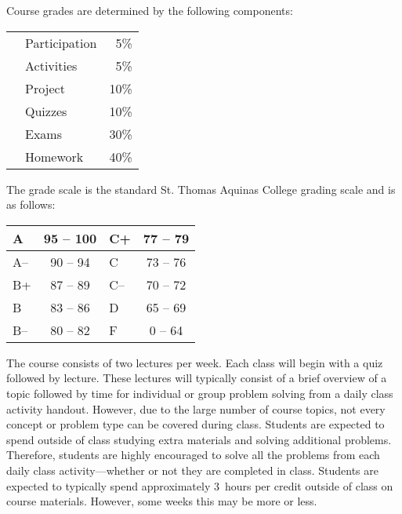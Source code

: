\documentclass[11pt,letterpaper]{article}
\begin{document}




Course grades are determined by the following components: \par
	\begin{table}[!ht]
        \begin{tabular}{clr}
	& Participation & 5\% \\
        & Activities & 5\% \\
	& Project & 10\% \\
	& Quizzes & 10\% \\
	& Exams & 30\% \\
	& Homework & 40\% 
        \end{tabular} 
        \end{table}
\sectionbreak



The grade scale is the standard St. Thomas Aquinas College grading scale and is as follows: \par
        \begin{table}[!ht]
        \centering
        \begin{tabular}{|l||c|l||c|} \hline
        A & 95 -- 100 & C+ & 77 -- 79 \\ \hline
        A-- & 90 -- 94 & C & 73 -- 76 \\ \hline
        B+ & 87 -- 89 & C-- & 70 -- 72 \\ \hline
        B & 83 -- 86 & D & 65 -- 69 \\ \hline
        B-- & 80 -- 82 & F & 0 -- 64 \\ \hline
        \end{tabular}
        \end{table}
\sectionbreak



The course consists of two lectures per week. Each class will begin with a quiz followed by lecture. These lectures will typically consist of a brief overview of a topic followed by time for individual or group problem solving from a daily class activity handout. However, due to the large number of course topics, not every concept or problem type can be covered during class. Students are expected to spend outside of class studying extra materials and solving additional problems. Therefore, students are highly encouraged to solve all the problems from each daily class activity---whether or not they are completed in class. Students are expected to typically spend approximately 3~hours per credit outside of class on course materials. However, some weeks this may be more or less. \sectionbreak
\end{document}
